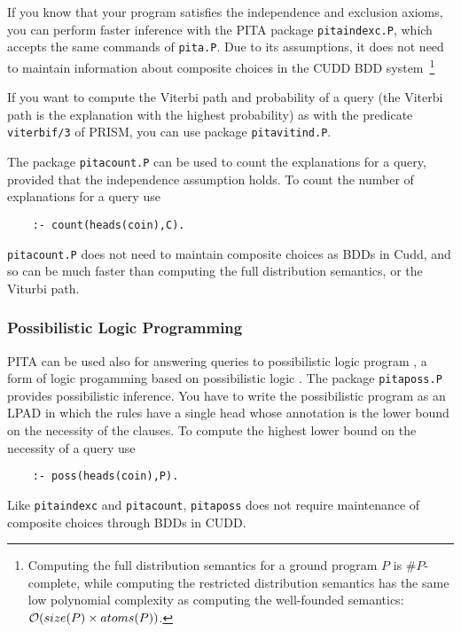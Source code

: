 If you know that your program satisfies the independence and exclusion
axioms, you can perform faster inference with the PITA package
\texttt{pitaindexc.P}, which accepts the same commands of
\texttt{pita.P}.  Due to its assumptions, it does not need to maintain
information about composite choices in the CUDD BDD
system~\footnote{Computing the full distribution semantics for a
  ground program $P$ is $\#P$-complete, while computing the restricted
  distribution semantics has the same low polynomial complexity as
  computing the well-founded semantics: ${\cal O}(size(P) \times
  atoms(P))$.}

If you want to compute the Viterbi path and probability of a query
(the Viterbi path is the explanation with the highest probability) as
with the predicate \texttt{viterbif/3} of PRISM, you can use package
\texttt{pitavitind.P}.

The package \texttt{pitacount.P} can be used to count the explanations
for a query, provided that the independence assumption holds. To count
the number of explanations for a query use
\begin{verbatim}
    :- count(heads(coin),C).
\end{verbatim}
\texttt{pitacount.P} does not need to maintain composite choices as
BDDs in Cudd, and so can be much faster than computing the full
distribution semantics, or the Viturbi path.

\subsubsection{Possibilistic Logic Programming}
PITA can be used also for answering queries to possibilistic logic
program \cite{DBLP:conf/iclp/DuboisLP91}, a form of logic progamming
based on possibilistic logic \cite{DubLanPra-poss-94}. The package
\texttt{pitaposs.P} provides possibilistic inference.  You have to
write the possibilistic program as an LPAD in which the rules have a
single head whose annotation is the lower bound on the necessity of
the clauses. To compute the highest lower bound on the necessity of a
query use
\begin{verbatim}
    :- poss(heads(coin),P).
\end{verbatim}
Like {\tt pitaindexc} and {\tt pitacount}, {\tt pitaposs} does not
require maintenance of composite choices through BDDs in CUDD.
